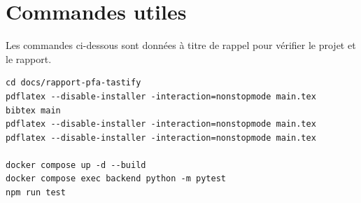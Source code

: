 \section{Commandes utiles}
Les commandes ci-dessous sont données à titre de rappel pour vérifier le projet et le rapport.

{\scriptsize
\begin{verbatim}
cd docs/rapport-pfa-tastify
pdflatex --disable-installer -interaction=nonstopmode main.tex
bibtex main
pdflatex --disable-installer -interaction=nonstopmode main.tex
pdflatex --disable-installer -interaction=nonstopmode main.tex

docker compose up -d --build
docker compose exec backend python -m pytest
npm run test
\end{verbatim}
}
